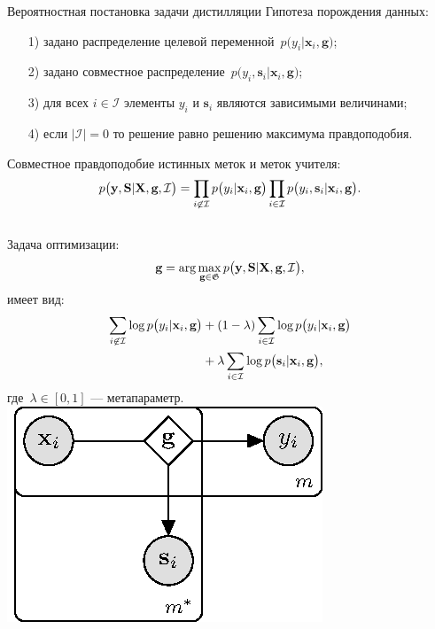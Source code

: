 \documentclass[10pt,pdf,hyperref={unicode}]{beamer}
\begin{document}
\begin{frame}{Вероятностная постановка задачи дистилляции}
\justifying
Гипотеза порождения данных:
\begin{enumerate}
	\item[1)] задано распределение целевой переменной~$p\bigr(y_i|\textbf{x}_i, \textbf{g}\bigr)$;
	\item[2)] задано совместное распределение~$p\bigr(y_i, \textbf{s}_i|\textbf{x}_i, \textbf{g}\bigr)$;
	\item[3)] для всех $i \in \mathcal{I}$ элементы $y_i$ и $\textbf{s}_i$ являются зависимыми величинами;
	\item[4)] если $|\mathcal{I}|=0$ то решение равно решению максимума правдоподобия.
\end{enumerate}
Совместное правдоподобие истинных меток и меток учителя:
\[
\setlength\abovedisplayskip{0pt}
p\bigr(\textbf{y}, \textbf{S}|\textbf{X}, \textbf{g}, \mathcal{I}\bigr)=\prod_{i\not\in \mathcal{I}}p\bigr(y_i|\textbf{x}_i, \textbf{g}\bigr)\prod_{i\in \mathcal{I}}p\bigr(y_i, \textbf{s}_i|\textbf{x}_i, \textbf{g}\bigr).
\setlength\belowdisplayskip{0pt}
\]

\begin{columns}
Задача оптимизации:
\[
\setlength\abovedisplayskip{0pt}
\textbf{g} = \arg\max_{\textbf{g} \in \mathfrak{G}} p\bigr(\textbf{y}, \textbf{S}|\textbf{X}, \textbf{g}, \mathcal{I}\bigr),
\setlength\belowdisplayskip{0pt}
\]
имеет вид:
\[
\setlength\abovedisplayskip{0pt}
\begin{aligned}
\sum_{i\not\in \mathcal{I}}\log p\bigr(y_i|\textbf{x}_i, \textbf{g}\bigr) &+ \left(1-\lambda\right)\sum_{i\in \mathcal{I}}\log p\bigr(y_i|\textbf{x}_i, \textbf{g}\bigr) \\
&+ \lambda\sum_{i\in \mathcal{I}}\log p\bigr(\textbf{s}_i|\textbf{x}_i, \textbf{g}\bigr),
\end{aligned}
\setlength\belowdisplayskip{0pt}
\]
где~$\lambda \in [0,1]$ --- метапараметр.
\includegraphics[width=\textwidth]{figures/proba_model}
\end{columns}

\end{frame}
\end{document}
